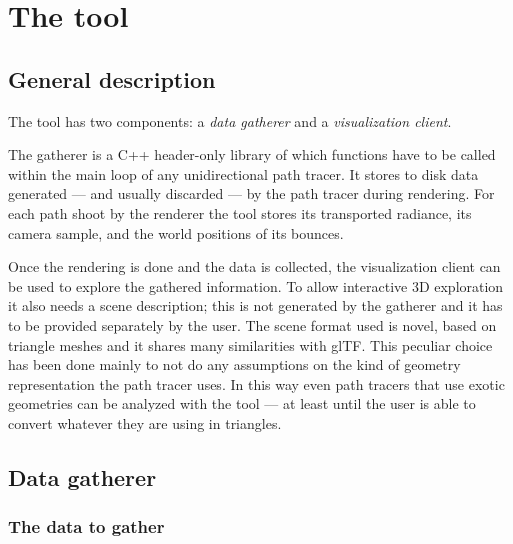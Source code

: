 \chapter{The tool}

\section{General description}
\label{tool_general_description}
The tool has two components: a \textit{data gatherer} and a \textit{visualization client}.

The gatherer is a C++ header-only library of which functions have to be called within the main loop of any unidirectional path tracer. It stores to disk data generated --- and usually discarded --- by the path tracer during rendering. For each path shoot by the renderer the tool stores its transported radiance, its camera sample, and the world positions of its bounces. 

Once the rendering is done and the data is collected, the visualization client can be used to explore the gathered information. To allow interactive 3D exploration it also needs a scene description; this is not generated by the gatherer and it has to be provided separately by the user. The scene format used is novel, based on triangle meshes and it shares many similarities with glTF\cite{robinet2014gltf}. This peculiar choice has been done mainly to not do any assumptions on the kind of geometry representation the path tracer uses. In this way even path tracers that use exotic geometries can be analyzed with the tool --- at least until the user is able to convert whatever they are using in triangles.


\section{Data gatherer}

\subsection{The data to gather}


